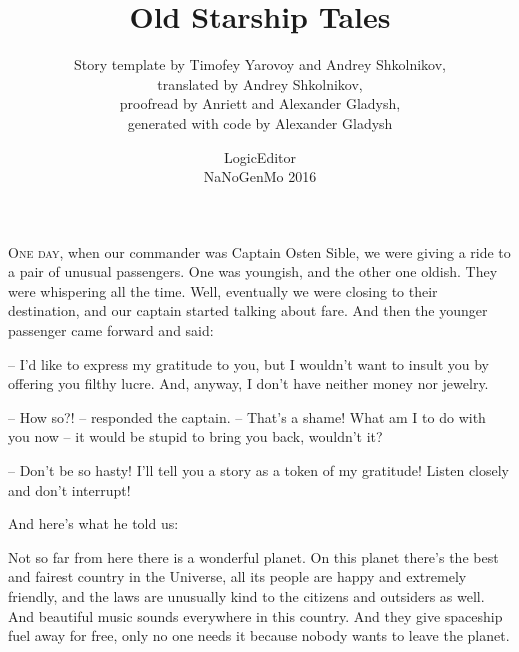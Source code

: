 \documentclass[ebook,twoside,final,openright]{memoir}
\begin{document}
\frontmatter
{}
\title{\Huge{Old Starship Tales}}
\author{
  Story template by Timofey Yarovoy and Andrey Shkolnikov,\\
  translated by Andrey Shkolnikov,\\
  proofread by Anriett and Alexander Gladysh,\\
  generated with code by Alexander Gladysh\\
}
\date{LogicEditor\\NaNoGenMo 2016}

\maketitle

\mainmatter

\chapter{}
\par
\lettrine{O}{ne day,} when our commander was Captain Osten Sible, we were giving a ride to a pair of unusual passengers. One was youngish, and the other one oldish. They were whispering all the time. Well, eventually we were closing to their destination, and our captain started talking about fare. And then the younger passenger came forward and said: \par
\par
– I'd like to express my gratitude to you, but I wouldn’t want to insult you by offering you filthy lucre. And, anyway, I don’t have neither money nor jewelry.\par
– How so?! – responded the captain. – That's a shame! What am I to do with you now – it would be stupid to bring you back, wouldn’t it? \par
– Don’t be so hasty! I'll tell you a story as a token of my gratitude! Listen closely and don’t interrupt! \par
 And here’s what he told us:\par
\par
Not so far from here there is a wonderful planet. On this planet there’s the best and fairest country in the Universe, all its people are happy and extremely friendly, and the laws are unusually kind to the citizens and outsiders as well. And beautiful music sounds everywhere in this country. And they give spaceship fuel away for free, only no one needs it because nobody wants to leave the planet. \par
\end{document}
